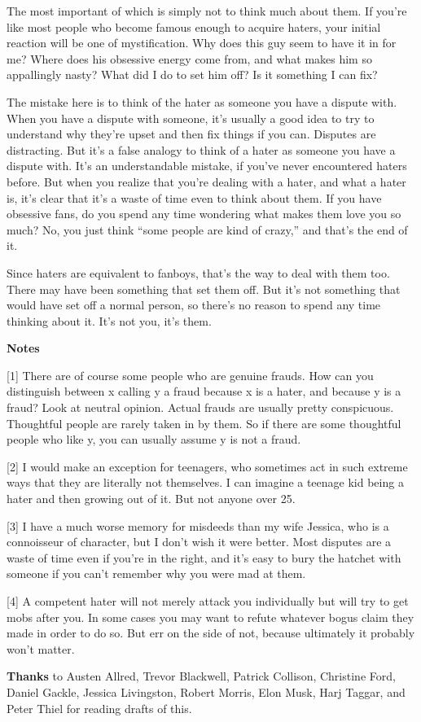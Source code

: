 The most important of which is simply not to think much about them. If
you're like most people who become famous enough to acquire haters, your
initial reaction will be one of mystification. Why does this guy seem to
have it in for me? Where does his obsessive energy come from, and what
makes him so appallingly nasty? What did I do to set him off? Is it
something I can fix?

The mistake here is to think of the hater as someone you have a dispute
with. When you have a dispute with someone, it's usually a good idea to
try to understand why they're upset and then fix things if you can.
Disputes are distracting. But it's a false analogy to think of a hater
as someone you have a dispute with. It's an understandable mistake, if
you've never encountered haters before. But when you realize that you're
dealing with a hater, and what a hater is, it's clear that it's a waste
of time even to think about them. If you have obsessive fans, do you
spend any time wondering what makes them love you so much? No, you just
think ``some people are kind of crazy,'' and that's the end of it.

Since haters are equivalent to fanboys, that's the way to deal with them
too. There may have been something that set them off. But it's not
something that would have set off a normal person, so there's no reason
to spend any time thinking about it. It's not you, it's them.

\textbf{Notes}

{[}1{]} There are of course some people who are genuine frauds. How can
you distinguish between x calling y a fraud because x is a hater, and
because y is a fraud? Look at neutral opinion. Actual frauds are usually
pretty conspicuous. Thoughtful people are rarely taken in by them. So if
there are some thoughtful people who like y, you can usually assume y is
not a fraud.

{[}2{]} I would make an exception for teenagers, who sometimes act in
such extreme ways that they are literally not themselves. I can imagine
a teenage kid being a hater and then growing out of it. But not anyone
over 25.

{[}3{]} I have a much worse memory for misdeeds than my wife Jessica,
who is a connoisseur of character, but I don't wish it were better. Most
disputes are a waste of time even if you're in the right, and it's easy
to bury the hatchet with someone if you can't remember why you were mad
at them.

{[}4{]} A competent hater will not merely attack you individually but
will try to get mobs after you. In some cases you may want to refute
whatever bogus claim they made in order to do so. But err on the side of
not, because ultimately it probably won't matter.

\textbf{Thanks} to Austen Allred, Trevor Blackwell, Patrick Collison,
Christine Ford, Daniel Gackle, Jessica Livingston, Robert Morris, Elon
Musk, Harj Taggar, and Peter Thiel for reading drafts of this.
